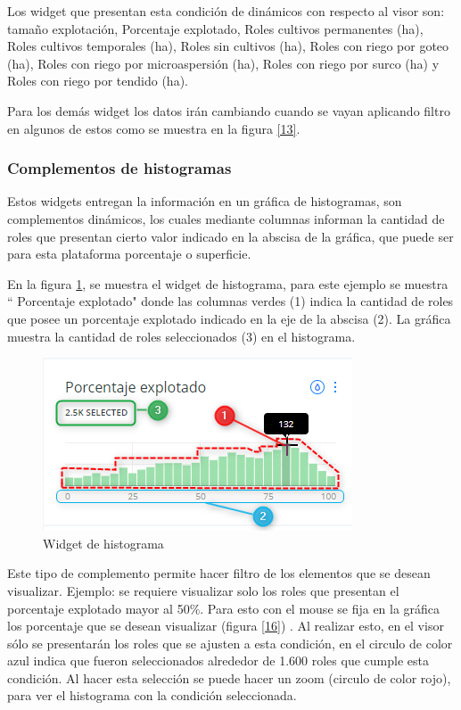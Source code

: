 \documentclass[10pt]{article}
\begin{document}
Los widget que presentan esta condición de dinámicos con respecto al visor son: tamaño explotación, Porcentaje explotado,  Roles cultivos permanentes (ha), Roles cultivos temporales (ha), Roles sin cultivos (ha), Roles con riego por goteo (ha), Roles con riego por microaspersión (ha), Roles con riego por surco (ha) y Roles con riego por tendido (ha).

Para los demás widget los datos irán cambiando cuando se vayan aplicando filtro en algunos de estos como se muestra en la figura \ref{13}. 


\subsubsection{Complementos de histogramas}

Estos widgets entregan la información en un gráfica de histogramas, son complementos dinámicos, los cuales mediante columnas informan la cantidad de roles que presentan cierto valor indicado en la abscisa de la gráfica, que puede ser para esta plataforma porcentaje o superficie. \bigskip\setlength{\parindent}{0pt}

En la figura \ref{histo12}, se muestra el widget de histograma, para este ejemplo se muestra “ Porcentaje explotado" donde las columnas verdes (1) indica la cantidad de roles que posee un porcentaje explotado indicado en la eje de la abscisa (2). La gráfica muestra la cantidad de roles seleccionados (3) en el histograma.

\begin{figure}[H]
\centering
\includegraphics[scale=1.2]{Figuras_manual/widget_histograma.png}
\caption{Widget de histograma}
\label{histo12}
\end{figure}

Este tipo de complemento permite hacer filtro de los elementos que se desean visualizar. Ejemplo: se 
requiere visualizar solo los roles que presentan el porcentaje explotado mayor al 50\%. Para esto con el mouse se fija en la gráfica los porcentaje que se desean visualizar (figura \ref{16}) . Al realizar esto, en el visor sólo se presentarán los roles que se ajusten a esta condición, en el circulo de color azul indica que fueron seleccionados alrededor de 1.600 roles que cumple esta condición. Al hacer esta selección se puede hacer un zoom (circulo de color rojo), para ver el histograma con la condición seleccionada.
\end{document}
